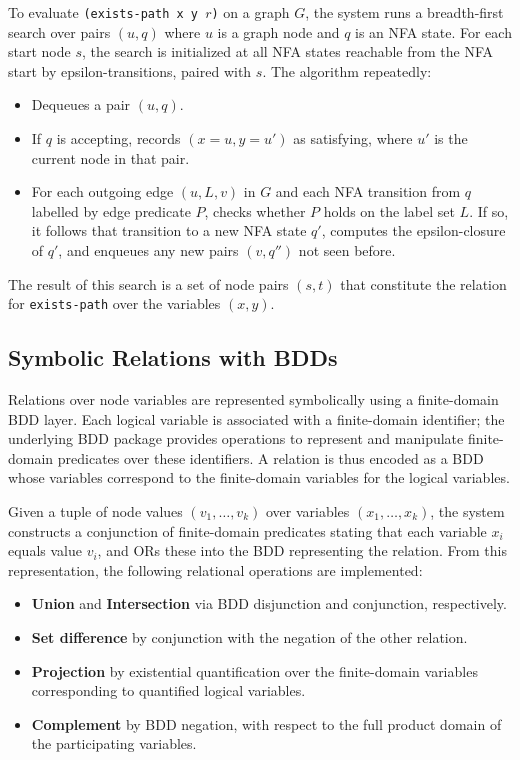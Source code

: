 \documentclass[11pt]{article}
\begin{document}
To evaluate \texttt{(exists-path x y $r$)} on a graph $G$, the system
runs a breadth-first search over pairs $(u,q)$ where $u$ is a graph
node and $q$ is an NFA state.  For each start node $s$, the search is
initialized at all NFA states reachable from the NFA start by
epsilon-transitions, paired with $s$.  The algorithm repeatedly:
\begin{itemize}[leftmargin=*]
  \item Dequeues a pair $(u,q)$.
  \item If $q$ is accepting, records $(x=u,y=u')$ as satisfying, where
        $u'$ is the current node in that pair.
  \item For each outgoing edge $(u,L,v)$ in $G$ and each NFA transition
        from $q$ labelled by edge predicate $P$, checks whether $P$
        holds on the label set $L$.  If so, it follows that transition
        to a new NFA state $q'$, computes the epsilon-closure of $q'$,
        and enqueues any new pairs $(v,q'')$ not seen before.
\end{itemize}

The result of this search is a set of node pairs $(s,t)$ that
constitute the relation for \texttt{exists-path} over the variables
$(x,y)$.

\subsection*{Symbolic Relations with BDDs}

Relations over node variables are represented symbolically using a
finite-domain BDD layer.  Each logical variable is associated with a
finite-domain identifier; the underlying BDD package provides
operations to represent and manipulate finite-domain predicates
over these identifiers.  A relation is thus encoded as a BDD whose
variables correspond to the finite-domain variables for the logical
variables.

Given a tuple of node values $(v_1,\dots,v_k)$ over variables
$(x_1,\dots,x_k)$, the system constructs a conjunction of
finite-domain predicates stating that each variable $x_i$ equals
value $v_i$, and ORs these into the BDD representing the relation.
From this representation, the following relational operations are
implemented:
\begin{itemize}[leftmargin=*]
  \item \textbf{Union} and \textbf{Intersection} via BDD disjunction
        and conjunction, respectively.
  \item \textbf{Set difference} by conjunction with the negation of
        the other relation.
  \item \textbf{Projection} by existential quantification over the
        finite-domain variables corresponding to quantified logical
        variables.
  \item \textbf{Complement} by BDD negation, with respect to the full
        product domain of the participating variables.
\end{itemize}
\end{document}

